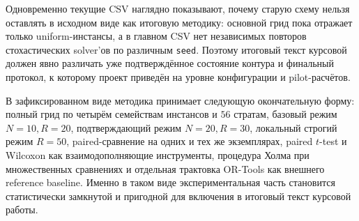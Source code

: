 \begin{refsection}
Одновременно текущие CSV наглядно показывают, почему старую схему нельзя оставлять в исходном виде как итоговую методику: основной грид пока отражает только uniform-инстансы, а в главном CSV нет независимых повторов стохастических solver'ов по различным \texttt{seed}. Поэтому итоговый текст курсовой должен явно различать уже подтверждённое состояние контура и финальный протокол, к которому проект приведён на уровне конфигурации и pilot-расчётов.

В зафиксированном виде методика принимает следующую окончательную форму: полный грид по четырём семействам инстансов и \(56\) стратам, базовый режим \(N=10, R=20\), подтверждающий режим \(N=20, R=30\), локальный строгий режим \(R=50\), paired-сравнение на одних и тех же экземплярах, paired \(t\)-test и Wilcoxon как взаимодополняющие инструменты, процедура Холма при множественных сравнениях и отдельная трактовка OR-Tools как внешнего reference baseline. Именно в таком виде экспериментальная часть становится статистически замкнутой и пригодной для включения в итоговый текст курсовой работы.

\printbibliography[title={Список литературы}]

\end{refsection}
